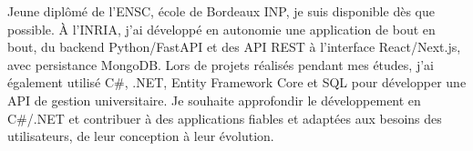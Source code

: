 
\begin{cvparagraph}
Jeune diplômé de l’ENSC, école de Bordeaux INP, je suis disponible dès que possible. À l’INRIA, j’ai développé en autonomie une application de bout en bout, du backend Python/FastAPI et des API REST à l’interface React/Next.js, avec persistance MongoDB. Lors de projets réalisés pendant mes études, j’ai également utilisé C\#, .NET, Entity Framework Core et SQL pour développer une API de gestion universitaire. Je souhaite approfondir le développement en C\#/.NET et contribuer à des applications fiables et adaptées aux besoins des utilisateurs, de leur conception à leur évolution.
\end{cvparagraph}
